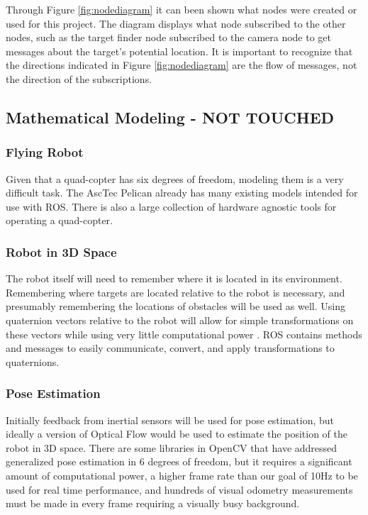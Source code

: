 \documentclass{article}
\begin{document}
	Through Figure \ref{fig:nodediagram} it can been shown what nodes were created or used for this project. The diagram displays what node subscribed to the other nodes, such as the target finder node subscribed to the camera node to get messages about the target's potential location. 
    It is important to recognize that the directions indicated in Figure \ref{fig:nodediagram} are the flow of messages, not the direction of the subscriptions. 

	
	\subsection{Mathematical Modeling - NOT TOUCHED}
	
		\subsubsection{Flying Robot}
	
		Given that a quad-copter has six degrees of freedom, modeling them is a very difficult task. The AscTec Pelican already has many existing models intended for use with ROS. There is also a large collection of hardware agnostic tools for operating a quad-copter.
	
		\subsubsection{Robot in 3D Space}
		
		The robot itself will need to remember where it is located in its environment. Remembering where targets are located relative to the robot is necessary, and presumably remembering the locations of obstacles will be used as well. Using quaternion vectors relative to the robot will allow for simple transformations on these vectors while using very little computational power \cite{williams2010combining}. ROS contains methods and messages to easily communicate, convert, and apply transformations to quaternions.
	
		\subsubsection{Pose Estimation}
	
		Initially feedback from inertial sensors will be used for pose estimation, but ideally a version of Optical Flow would be used to estimate the position of the robot in 3D space. There are some libraries in OpenCV that have addressed generalized pose estimation in 6 degrees of freedom, but it requires a significant amount of computational power, a higher frame rate than our goal of 10Hz to be used for real time performance, and hundreds of visual odometry measurements must be made in every frame requiring a visually busy background.
\end{document}
